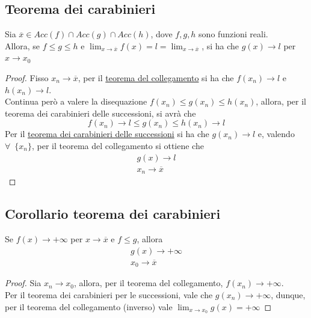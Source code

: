\documentclass{article}
\theoremstyle{definition}
\begin{document}
\subsection{Teorema dei carabinieri}
Sia $\overline{x} \in Acc(f) \cap Acc(g) \cap Acc(h)$, dove $f,g,h$ sono funzioni reali.
\\
Allora, se $f \leqslant g \leqslant h$ e $\lim_{x \to \overline{x}}f(x)=l=\lim_{x \to \overline{x}}$, si ha che $g(x) \to l$ per $x \to x_0$
\begin{proof}
    Fisso $x_n \to \overline{x}$, per il \underline{teorema del collegamento} si ha che $f(x_n) \to l$ e $h(x_n) \to l$.
    \\
    Continua però a valere la disequazione $f(x_n) \leqslant g(x_n) \leqslant h(x_n)$, allora, per il teorema dei carabinieri delle successioni, si avrà che
    \begin{equation}
        f(x_n) \to l \leqslant g(x_n) \leqslant h(x_n) \to l
    \end{equation}
    Per il \underline{teorema dei carabinieri delle successioni} si ha che $g(x_n) \to l$ e, valendo $\forall \,\,\, \{x_n\}$, per il teorema del collegamento si ottiene che
    \begin{align*}
        g(x) \to l \\
        x_n \to \overline{x}
    \end{align*}
\end{proof}
\subsection{Corollario teorema dei carabinieri}
Se $f(x) \to +\infty$ per $x \to \overline{x}$ e $f \leqslant g$, allora
\begin{align*}
    g(x) \to +\infty \\
    x_0 \to \overline{x}
\end{align*}
\begin{proof}
   Sia $x_n \to x_0$, allora, per il teorema del collegamento, $f(x_n) \to +\infty$.
   \\
   Per il teorema dei carabinieri per le successioni, vale che $g(x_n) \to +\infty$, dunque, per il teorema del collegamento (inverso) vale $\lim_{x \to x_0}g(x)=+\infty$
\end{proof}
\newpage
\end{document}
